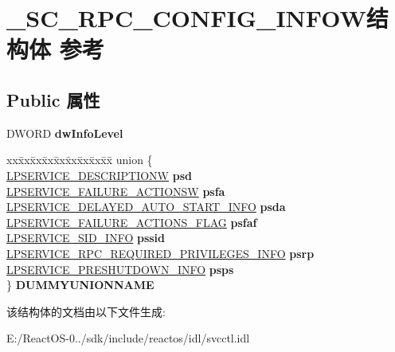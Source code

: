 \hypertarget{struct___s_c___r_p_c___c_o_n_f_i_g___i_n_f_o_w}{}\section{\+\_\+\+S\+C\+\_\+\+R\+P\+C\+\_\+\+C\+O\+N\+F\+I\+G\+\_\+\+I\+N\+F\+O\+W结构体 参考}
\label{struct___s_c___r_p_c___c_o_n_f_i_g___i_n_f_o_w}
\subsection*{Public 属性}
\begin{DoxyCompactItemize}
\item 
\mbox{\label{struct___s_c___r_p_c___c_o_n_f_i_g___i_n_f_o_w_aea928e9cb6c46cf528eda11190a9a0ae}} 
D\+W\+O\+RD {\bfseries dw\+Info\+Level}
\item 
\mbox{\label{struct___s_c___r_p_c___c_o_n_f_i_g___i_n_f_o_w_ad1bd15d9d908033b2978812a3f2bf8a7}} 
\begin{tabbing}
xx\=xx\=xx\=xx\=xx\=xx\=xx\=xx\=xx\=\kill
union \{\\
\>\hyperlink{struct___s_e_r_v_i_c_e___d_e_s_c_r_i_p_t_i_o_n_w}{LPSERVICE\_DESCRIPTIONW} {\bfseries psd}\\
\>\hyperlink{struct___s_e_r_v_i_c_e___f_a_i_l_u_r_e___a_c_t_i_o_n_s_w}{LPSERVICE\_FAILURE\_ACTIONSW} {\bfseries psfa}\\
\>\hyperlink{struct___s_e_r_v_i_c_e___d_e_l_a_y_e_d___a_u_t_o___s_t_a_r_t___i_n_f_o}{LPSERVICE\_DELAYED\_AUTO\_START\_INFO} {\bfseries psda}\\
\>\hyperlink{struct___s_e_r_v_i_c_e___f_a_i_l_u_r_e___a_c_t_i_o_n_s___f_l_a_g}{LPSERVICE\_FAILURE\_ACTIONS\_FLAG} {\bfseries psfaf}\\
\>\hyperlink{struct___s_e_r_v_i_c_e___s_i_d___i_n_f_o}{LPSERVICE\_SID\_INFO} {\bfseries pssid}\\
\>\hyperlink{struct___s_e_r_v_i_c_e___r_p_c___r_e_q_u_i_r_e_d___p_r_i_v_i_l_e_g_e_s___i_n_f_o}{LPSERVICE\_RPC\_REQUIRED\_PRIVILEGES\_INFO} {\bfseries psrp}\\
\>\hyperlink{struct___s_e_r_v_i_c_e___p_r_e_s_h_u_t_d_o_w_n___i_n_f_o}{LPSERVICE\_PRESHUTDOWN\_INFO} {\bfseries psps}\\
\} {\bfseries DUMMYUNIONNAME}\\

\end{tabbing}\end{DoxyCompactItemize}


该结构体的文档由以下文件生成\+:\begin{DoxyCompactItemize}
\item 
E\+:/\+React\+O\+S-\/0../sdk/include/reactos/idl/svcctl.\+idl\end{DoxyCompactItemize}
